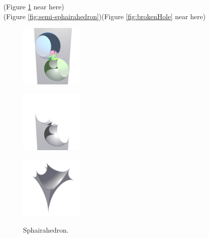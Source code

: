 \documentclass[suppldata, dvipdfmx]{interact}
\theoremstyle{plain}%
\theoremstyle{definition}
\theoremstyle{remark}
\theoremstyle{problemstyle}
\begin{document}
\noindent(Figure \ref{fig:sphairahedron}
 near here)\\
\noindent(Figure \ref{fig:semi-sphairahedron})(Figure \ref{fig:brokenHole} near here)

\begin{figure}[h!tbp]
  \begin{minipage}[t]{0.3\textwidth}
   \centering
   \includegraphics[width=1.2in, height=1.2in, keepaspectratio]
   {./img/sphairahedralPrism/sphairaAll.jpg}
   \label{fig:sphairaPrismAll}
  \end{minipage}
  \hspace*{\fill}
  \begin{minipage}[t]{0.3\textwidth}
   \centering
   \includegraphics[width=1.2in, height=1.2in, keepaspectratio]
   {./img/sphairahedralPrism/sphairaHalf.jpg}
   \label{fig:sphairaPrismHalf}
  \end{minipage}
  \hspace*{\fill}
  \begin{minipage}[t]{0.3\textwidth}
   \centering
   \includegraphics[width=1.2in, height=1.2in,
   keepaspectratio]{./img/sphairahedralPrism/sphairahedron.jpg} 
   \label{fig:sphairahedronFinite}
  \end{minipage}
  \hspace*{\fill}
  \caption{Sphairahedron.}
  \label{fig:sphairahedron}
 \end{figure}
\end{document}
